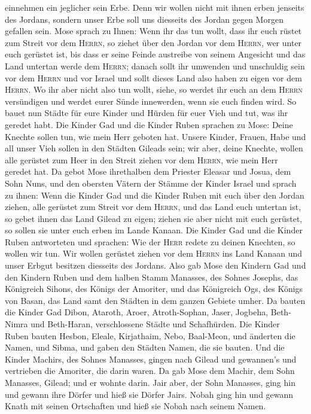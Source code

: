einnehmen ein jeglicher sein Erbe.  Denn wir wollen nicht
mit ihnen erben jenseits des Jordans, sondern unser Erbe soll uns
diesseits des Jordan gegen Morgen gefallen sein.  Mose
sprach zu Ihnen: Wenn ihr das tun wollt, dass ihr euch rüstet zum Streit
vor dem \textsc{Herrn},  so ziehet über den Jordan vor
dem \textsc{Herrn}, wer unter euch gerüstet ist, bis dass er seine
Feinde austreibe von seinem Angesicht  und das Land
untertan werde dem \textsc{Herrn}; danach sollt ihr umwenden und
unschuldig sein vor dem \textsc{Herrn} und vor Israel und sollt dieses
Land also haben zu eigen vor dem \textsc{Herrn}.  Wo ihr
aber nicht also tun wollt, siehe, so werdet ihr euch an dem
\textsc{Herrn} versündigen und werdet eurer Sünde innewerden, wenn sie
euch finden wird.  So bauet nun Städte für eure Kinder
und Hürden für euer Vieh und tut, was ihr geredet habt. 
Die Kinder Gad und die Kinder Ruben sprachen zu Mose: Deine Knechte
sollen tun, wie mein Herr geboten hat.  Unsere Kinder,
Frauen, Habe und all unser Vieh sollen in den Städten Gileads sein;
 wir aber, deine Knechte, wollen alle gerüstet zum Heer
in den Streit ziehen vor dem \textsc{Herrn}, wie mein Herr geredet hat.
 Da gebot Mose ihrethalben dem Priester Eleasar und
Josua, dem Sohn Nuns, und den obersten Vätern der Stämme der Kinder
Israel  und sprach zu ihnen: Wenn die Kinder Gad und die
Kinder Ruben mit euch über den Jordan ziehen, alle gerüstet zum Streit
vor dem \textsc{Herrn}, und das Land euch untertan ist, so gebet ihnen
das Land Gilead zu eigen;  ziehen sie aber nicht mit euch
gerüstet, so sollen sie unter euch erben im Lande Kanaan.
 Die Kinder Gad und die Kinder Ruben antworteten und
sprachen: Wie der \textsc{Herr} redete zu deinen Knechten, so wollen wir
tun.  Wir wollen gerüstet ziehen vor dem \textsc{Herrn}
ins Land Kanaan und unser Erbgut besitzen diesseits des Jordans.
 Also gab Mose den Kindern Gad und den Kindern Ruben und
dem halben Stamm Manasses, des Sohnes Josephs, das Königreich Sihons,
des Königs der Amoriter, und das Königreich Ogs, des Königs von Basan,
das Land samt den Städten in dem ganzen Gebiete umher. 
Da bauten die Kinder Gad Dibon, Ataroth, Aroer, 
Atroth-Sophan, Jaser, Jogbeha,  Beth-Nimra und
Beth-Haran, verschlossene Städte und Schafhürden.  Die
Kinder Ruben bauten Hesbon, Eleale, Kirjathaim,  Nebo,
Baal-Meon, und änderten die Namen, und Sibma, und gaben den Städten
Namen, die sie bauten.  Und die Kinder Machirs, des
Sohnes Manasses, gingen nach Gilead und gewannen's und vertrieben die
Amoriter, die darin waren.  Da gab Mose dem Machir, dem
Sohn Manasses, Gilead; und er wohnte darin.  Jair aber,
der Sohn Manasses, ging hin und gewann ihre Dörfer und hieß sie Dörfer
Jairs.  Nobah ging hin und gewann Knath mit seinen
Ortschaften und hieß sie Nobah nach seinem Namen.

